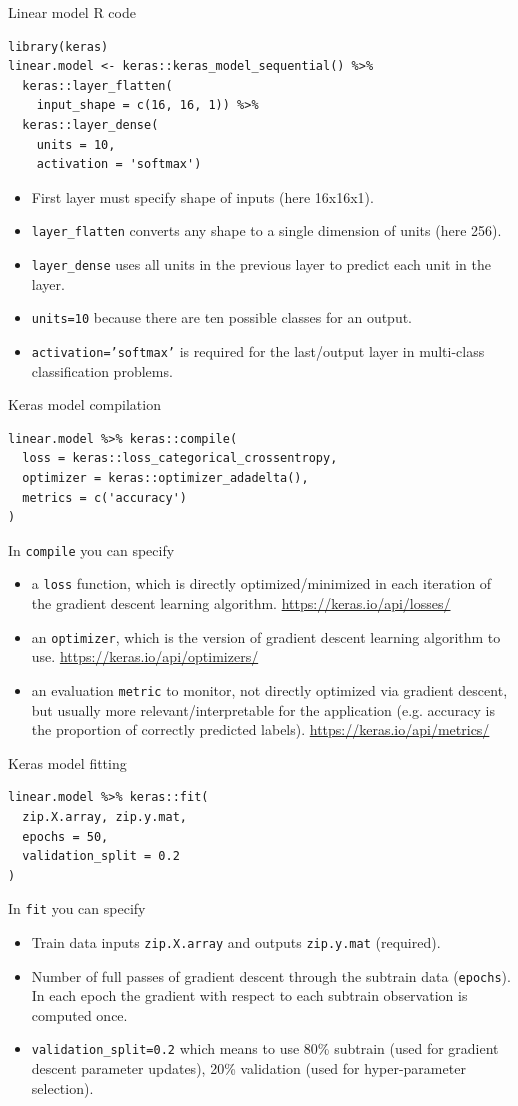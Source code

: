 \documentclass[12pt]{article}
\begin{document}
{Linear model R code}
\begin{verbatim}
library(keras)
linear.model <- keras::keras_model_sequential() %>%
  keras::layer_flatten(
    input_shape = c(16, 16, 1)) %>%
  keras::layer_dense(
    units = 10,
    activation = 'softmax')
\end{verbatim}
  \begin{itemize}
  \item First layer must specify shape of inputs (here 16x16x1).
  \item \texttt{layer\_flatten} converts any shape to a single dimension
    of units (here 256).
  \item \texttt{layer\_dense} uses all units in the previous layer to
    predict each unit in the layer.
  \item \texttt{units=10} because there are ten possible classes for an output.
  \item \texttt{activation='softmax'} is required for the last/output layer in
    multi-class classification problems.
\end{itemize}

{Keras model compilation}
\begin{verbatim}
linear.model %>% keras::compile(
  loss = keras::loss_categorical_crossentropy,
  optimizer = keras::optimizer_adadelta(),
  metrics = c('accuracy')
)
\end{verbatim}
In \texttt{compile} you can specify
\begin{itemize}
\item a \texttt{loss} function, which is directly optimized/minimized
  in each iteration of the gradient descent learning algorithm. 
  \url{https://keras.io/api/losses/} 
\item an \texttt{optimizer}, which is the version of gradient descent
  learning algorithm to use. 
  \url{https://keras.io/api/optimizers/} 
\item an evaluation \texttt{metric} to monitor, not directly optimized
  via gradient descent, but usually more relevant/interpretable for
  the application (e.g. accuracy is the proportion of correctly
  predicted labels). \url{https://keras.io/api/metrics/} 
\end{itemize}
 
{Keras model fitting}
\begin{verbatim}
linear.model %>% keras::fit(
  zip.X.array, zip.y.mat,
  epochs = 50,
  validation_split = 0.2
)
\end{verbatim}
In \texttt{fit} you can specify
\begin{itemize}
\item Train data inputs \texttt{zip.X.array} and outputs
  \texttt{zip.y.mat} (required).
\item Number of full passes of gradient descent through the subtrain
  data (\texttt{epochs}). In each epoch the gradient with respect to
  each subtrain observation is computed once.
\item \texttt{validation\_split=0.2} which means to use 80\% subtrain
  (used for gradient descent parameter updates), 20\% validation (used
  for hyper-parameter selection). 
\end{itemize}
\end{document}
